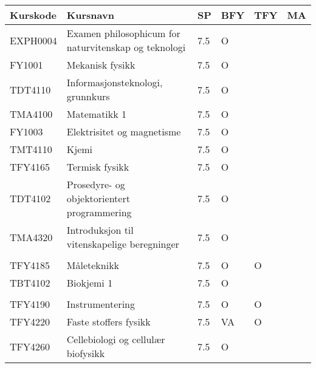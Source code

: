 \documentclass{article}
\begin{document}
\begin{table}[!ht]
  \scriptsize
  \begin{tabular}{llllll}
    \toprule
    Kurskode & Kursnavn                                                           & SP  & BFY & TFY & MA \\
    \midrule
    EXPH0004 & Examen philosophicum for naturvitenskap og teknologi               & 7.5 & O   &     &    \\
    FY1001   & Mekanisk   fysikk                                                  & 7.5 & O   &     &    \\
    TDT4110  & Informasjonsteknologi,   grunnkurs                                 & 7.5 & O   &     &    \\
    TMA4100  & Matematikk 1                                                       & 7.5 & O   &     &    \\
    FY1003   & Elektrisitet   og magnetisme                                       & 7.5 & O   &     &    \\
    TMT4110  & Kjemi                                                              & 7.5 & O   &     &    \\
    TFY4165  & Termisk   fysikk                                                   & 7.5 & O   &     &    \\
    TDT4102  & Prosedyre-   og objektorientert programmering                      & 7.5 & O   &     &    \\
    TMA4320  & Introduksjon   til vitenskapelige beregninger                      & 7.5 & O   &     &    \\
             &                                                                    &     &     &     &    \\
    TFY4185  & Måleteknikk                                                        & 7.5 & O   & O   &    \\
    TBT4102  & Biokjemi 1                                                         & 7.5 & O   &     &    \\
             &                                                                    &     &     &     &    \\
    TFY4190  & Instrumentering                                                    & 7.5 & O   & O   &    \\
    TFY4220  & Faste   stoffers fysikk                                            & 7.5 & VA  & O   &    \\
    TFY4260  & Cellebiologi   og cellulær biofysikk                               & 7.5 & O   &     &    \\

\end{tabular}
\end{table}
\end{document}
